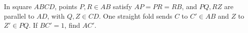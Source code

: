 In square $ABCD$, points $P,R\in AB$ satisfy $AP=PR=RB$, and $PQ,RZ$ are parallel to $AD$, with $Q,Z\in CD$. One straight fold sends $C$ to $C'\in AB$ and $Z$ to $Z'\in PQ$. If $BC'=1$, find $AC'$.
